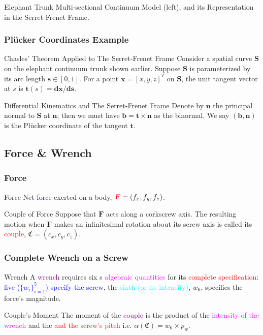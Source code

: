 \begin{frame}
\begin{columns}[]
\begin{column}{.68\linewidth}
		\end{column}
	\end{columns}
	\footnotesize{Elephant Trunk Multi-sectional Continuum Model (left), and its Representation in the Serret-Frenet Frame.}
\end{frame}
\begin{frame}
	\frametitle{Pl{\"u}cker Coordinates Example}
	\begin{block}{Chasles' Theorem Applied to The Serret-Frenet Frame}
		Consider a spatial curve $\bm{S}$ on the elephant continuum trunk shown earlier. Suppose $\bm{S}$ is parameterized by its arc length $\bm{s} \in [0, 1]$. 
		For a point $\bm{x}=\left[x, y, z\right]^T$ on $\bm{S}$, the unit tangent vector at $s$ is $\bm{t}(s)=\bm{dx}/\bm{ds}$.
	\end{block}
	\begin{block}{Differential Kinematics and The Serret-Frenet Frame}
		Denote by $\bm{n}$ the principal normal to $\bm{S}$ at $\bm{n}$; then we must have $\bm{b}=\bm{t}\times \bm{n}$ as the binormal. We say $(\bm{b},\bm{n})$ is the Pl{\"u}cker coordinate of the tangent $\bm{t}$.
	\end{block}
\end{frame}

\subsection{Force \& Wrench}
\begin{frame}
	\frametitle{Force}
	\begin{block}{Force}
		Net \textcolor{blue}{force} exerted on a body, 
		$\textcolor{red}{\bm{F}} = (f_x, f_y, f_z)$.
	\end{block}
	\begin{block}{Couple of Force}
		Suppose that $\bm{F}$ acts along a corkscrew axis. The resulting motion when $\bm{F}$ makes an infinitesimal rotation about its screw axis  is called its \textcolor{red}{couple}, $\mathfrak{C} = (c_x, c_y, c_z)$.
	\end{block}
\end{frame}

\begin{frame}
	\frametitle{Complete Wrench on a Screw}
	\begin{block}{Wrench}		
		A \textcolor{purple}{wrench} requires six 
		s \textcolor{magenta}{algebraic quantities} for its  \textcolor{red}{complete specification}:  \textcolor{blue}{five ($\{w_i\}_{i=1}^5$) specify the screw}, the \textcolor{cyan}{sixth (or its intensity)}, $w_6$, specifies the \textcolor{light-blue}{force's magnitude}.
	\end{block}
	\begin{block}{Couple's Moment}		
		The moment of the \textcolor{purple}{couple} is the product of the \textcolor{magenta}{intensity of the wrench} and the \textcolor{red}{ and the screw's pitch} i.e. $\alpha(\mathfrak{C}) = w_6 \times p_w$.
	\end{block}
\end{frame}

